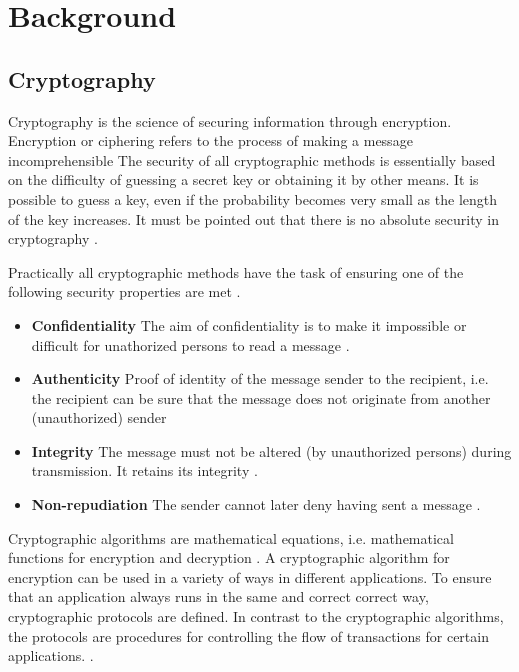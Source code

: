 \chapter{Background}
\section{Cryptography}

Cryptography is the science of securing information through encryption. Encryption or ciphering refers to the process of making a message incomprehensible \cite[18]{crypto} The security of all cryptographic methods is essentially based on the difficulty of guessing a secret key or obtaining it by other means. It is possible to guess a key, even if the probability becomes very small as the length of the key increases. It must be pointed out that there is no absolute security in cryptography \cite[25]{crypto}.

Practically all cryptographic methods have the task of ensuring one of the following security properties are met \cite[18]{crypto}. 
\begin{itemize}
    \item \textbf{Confidentiality} The aim of confidentiality is to make it impossible or difficult for unathorized persons to read a message \cite[18]{crypto}.
    \item \textbf{Authenticity} Proof of identity of the message sender to the recipient, i.e. the recipient can be sure that the message does not originate from another (unauthorized) sender \cite[18]{crypto}
    \item \textbf{Integrity} The message must not be altered (by unauthorized persons) during transmission. It retains its integrity \cite[18]{crypto}.
    \item \textbf{Non-repudiation} The sender cannot later deny having sent a message \cite[18]{crypto}.
\end{itemize}

Cryptographic algorithms are mathematical equations, i.e. mathematical functions for encryption and decryption \cite[19]{crypto}. A cryptographic algorithm for encryption can be used in a variety of ways in different applications. To ensure that an application always runs in the same and correct correct way, cryptographic protocols are defined. In contrast to the cryptographic algorithms, the protocols are procedures for controlling the flow of transactions for certain applications. \cite[22]{crypto}.

